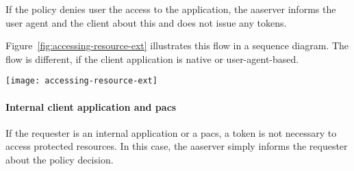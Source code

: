 If the policy denies user the access to the application, the \acrshort{aaserver} informs the user agent and the client about this and does not issue any tokens.

Figure~\ref{fig:accessing-resource-ext} illustrates this flow in a sequence diagram. The flow is different, if the client application is native or user-agent-based.

\begin{sidewaysfigure}[p]
    \centering
    \texttt{[image: accessing-resource-ext]}
    \caption{Sign-in and access token issuance process to external server-based client application.}
    \label{fig:accessing-resource-ext}
\end{sidewaysfigure}

\paragraph{Internal client application and \acrshort{pacs}}
If the requester is an internal application or a \acrshort{pacs}, a token is not necessary to access protected resources. In this case, the \acrshort{aaserver} simply informs the requester about the policy decision.

